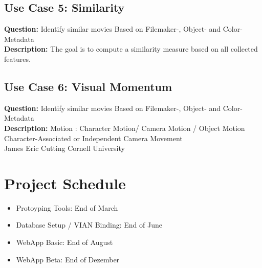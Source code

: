 \documentclass[11pt, a4paper,oneside,chapterprefix=false]{scrbook}
\begin{document}
\subsection{Use Case 5: Similarity}
\textbf{Question:} Identify similar movies Based on Filemaker-, Object- and Color-Metadata\\
\textbf{Description:} The goal is to compute a similarity measure based on all collected features.

\subsection{Use Case 6: Visual Momentum}
\textbf{Question:} Identify similar movies Based on Filemaker-, Object- and Color-Metadata\\
\textbf{Description:} Motion : Character Motion/ Camera Motion / Object Motion
Character-Associated or Independent Camera Movement\\

James Eric Cutting Cornell University

\section{Project Schedule}
\begin{itemize}
	\item Protoyping Tools: End of March
	\item Database Setup / VIAN Binding: End of June
	\item WebApp Basic: End of August
	\item WebApp Beta: End of Dezember
\end{itemize}
\end{document}
